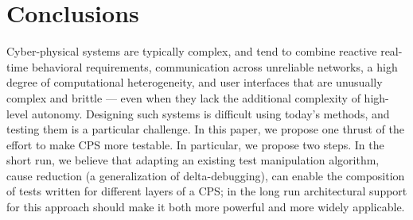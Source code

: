 \section{Conclusions}

Cyber-physical systems are typically complex, and tend to combine reactive real-time behavioral requirements, communication across unreliable networks, a high degree of computational heterogeneity, and user interfaces that are unusually complex and brittle --- even when they lack the additional complexity of high-level autonomy.  Designing such systems is difficult using today's methods, and testing them is a particular challenge.  In this paper, we propose one thrust of the effort to make CPS more testable.  In particular, we propose two steps.  In the short run, we believe that adapting an existing test manipulation algorithm, cause reduction (a generalization of delta-debugging), can enable the composition of tests written for different layers of a CPS; in the long run architectural support for this approach should make it both more powerful and more widely applicable.